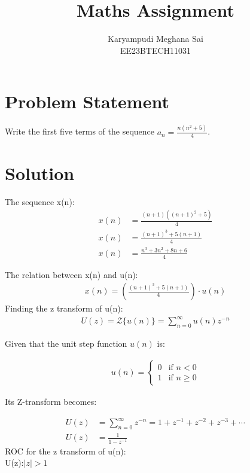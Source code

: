 \documentclass{article}
\begin{document}
\title{Maths Assignment}
\author{Karyampudi Meghana Sai\\ EE23BTECH11031}
\maketitle

\section*{Problem Statement}
Write the first five terms of the sequence \(a_n = \frac{n(n^2+5)}{4}\).

\section*{Solution}
The sequence x(n):
\begin{align}
x(n) &= \frac{(n+1)((n+1)^2+5)}{4}\\
x(n)&=\frac{(n+1)^3+5(n+1)}{4}\\
x(n)&=\frac{n^3+3n^2+8n+6}{4}
\end{align}
 





The relation between x(n) and u(n):
\begin{align}
 x(n) = \left(\frac{(n+1)^3+5(n+1)}{4}\right) \cdot u(n)
 \end{align}
Finding the z transform of u(n):
\begin{align}
U(z) = \mathcal{Z}\{u(n)\} = \sum_{n=0}^{\infty} u(n)z^{-n}
\end{align}

Given that the unit step function \(u(n)\) is:

\begin{align} 
u(n) = \begin{cases} 0 & \text{if } n < 0 \\ 1 & \text{if } n \geq 0 \end{cases}
 \end{align}

Its Z-transform becomes:

\begin{align}
U(z) &= \sum_{n=0}^{\infty} z^{-n} = 1 + z^{-1} + z^{-2} + z^{-3} + \dotsb  \\
U(z) &= \frac{1}{1- z^{-1}}
\end{align}
ROC for the z transform of u(n):\\
 U(z):$\lvert z \rvert > 1$
\end{document}
